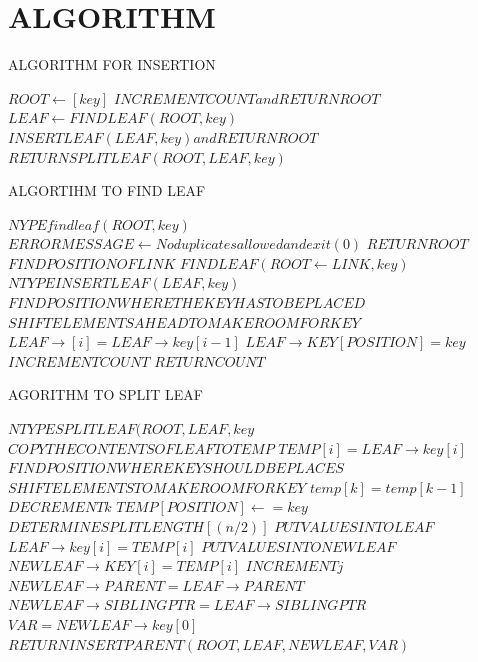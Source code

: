 \documentclass{article}
\begin{document}
\section {ALGORITHM}
\begin{algorithm}
\caption {ALGORITHM FOR INSERTION}
\begin {algorithmic}
\STATE $ ROOT \leftarrow[key]  $
\ENDIF
\STATE $ INCREMENT COUNT and RETURN ROOT $
\STATE $ LEAF \leftarrow FIND LEAF(ROOT, key) $
\STATE $ INSERT LEAF (LEAF, key) and RETURN ROOT $
\STATE $ RETURN SPLIT LEAF(ROOT, LEAF, key)$
\ENDIF 
\end{algorithmic}
\end{algorithm}

\pagebreak
\begin{algorithm}
\caption{ ALGORTIHM TO FIND LEAF }
\begin{algorithmic}
\STATE $ {NYPE find leaf(ROOT, key)} $
\STATE $ ERROR MESSAGE \leftarrow No duplicates allowed and exit(0)$
\ENDIF
{}
\STATE $ RETURN ROOT $
\ENDIF
\STATE $FIND POSITION OF LINK$
\STATE $ FIND LEAF(ROOT \leftarrow LINK, key) $
\STATE ${NTYPE INSERT LEAF(LEAF, key)} $
\STATE $ FIND POSITION WHERE THE KEY HAS TO BE PLACED $
\STATE $ SHIFT ELEMENTS AHEAD TO MAKE ROOM FOR KEY $
\STATE $ LEAF\rightarrow[i]=LEAF\rightarrow key[i-1] $
\ENDFOR
\STATE $LEAF\rightarrow KEY[POSITION]=key $
\STATE $INCREMENT COUNT $
\STATE $ RETURN COUNT $
\end{algorithmic}
\end{algorithm}

\pagebreak
\begin{algorithm}
\caption {AGORITHM TO SPLIT LEAF}
\begin{algorithmic}
\STATE $ {NTYPE SPLIT LEAF (ROOT, LEAF, key} $ 
\STATE $ COPY THE CONTENTS OF LEAF TO TEMP $
\STATE $ TEMP[i]=LEAF\rightarrow key[i] $
\ENDFOR
\STATE $FIND POSITION WHERE KEY SHOULD BE PLACES $
\STATE $ SHIFT ELEMENTS TO MAKE ROOM FOR KEY $
\STATE $temp[k]=temp[k-1] $
\STATE $DECREMENT k$
\ENDWHILE
\STATE $TEMP[POSITION]\leftarrow=key$
\STATE $ DETERMINE SPLIT LENGTH[(n/2)] $
\STATE $ PUT VALUES INTO LEAF $
\STATE $LEAF\rightarrow key[i]=TEMP[i]$
\ENDFOR
\STATE $ PUT VALUES INTO NEW LEAF $
\STATE $NEW LEAF \rightarrow KEY[i]=TEMP[i]$
\STATE $INCREMENT j$
\ENDFOR
\STATE $NEW LEAF \rightarrow PARENT=LEAF\rightarrow PARENT $
\STATE $NEW LEAF \rightarrow SIBLING PTR = LEAF \rightarrow SIBLING PTR$
\STATE $ VAR=NEW LEAF\rightarrow key[0] $
\STATE $ RETURN INSERT PARENT (ROOT, LEAF, NEW LEAF, VAR) $
\end{algorithmic}
\end{algorithm}
\end{document}
